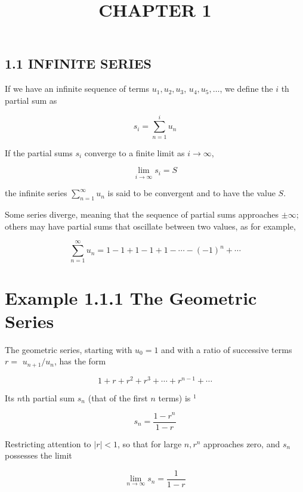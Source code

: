 \documentclass[10pt]{article}
\title{CHAPTER 1 }
\author{}
\date{}
\begin{document}
\maketitle
\subsection*{1.1 INFINITE SERIES}
If we have an infinite sequence of terms $u_{1}, u_{2}, u_{3}$, $u_{4}, u_{5}, \ldots$, we define the $i$ th partial sum as


\begin{equation*} \label{eq: fin_sum}
s_{i}=\sum_{n=1}^{i} u_{n} \tag{1.1}
\end{equation*}


If the partial sums $s_{i}$ converge to a finite limit as $i \rightarrow \infty$,


\begin{equation*} \label{eq: inf_lim}
\lim _{i \rightarrow \infty} s_{i}=S \tag{1.2}
\end{equation*}


the infinite series $\sum_{n=1}^{\infty} u_{n}$ is said to be convergent and to have the value $S$. 

Some series diverge, meaning that the sequence of partial sums approaches $\pm \infty$; others may have partial sums that oscillate between two values, as for example,

$$
\sum_{n=1}^{\infty} u_{n}=1-1+1-1+1-\cdots-(-1)^{n}+\cdots
$$

\section*{Example 1.1.1 The Geometric Series}
The geometric series, starting with $u_{0}=1$ and with a ratio of successive terms $r=$ $u_{n+1} / u_{n}$, has the form

$$
1+r+r^{2}+r^{3}+\cdots+r^{n-1}+\cdots
$$

Its $n$th partial sum $s_{n}$ (that of the first $n$ terms) is ${ }^{1}$


\begin{equation*}
s_{n}=\frac{1-r^{n}}{1-r} \tag{1.3}
\end{equation*}


Restricting attention to $|r|<1$, so that for large $n, r^{n}$ approaches zero, and $s_{n}$ possesses the limit


\begin{equation*}
\lim _{n \rightarrow \infty} s_{n}=\frac{1}{1-r} \tag{1.4}
\end{equation*}
\end{document}
